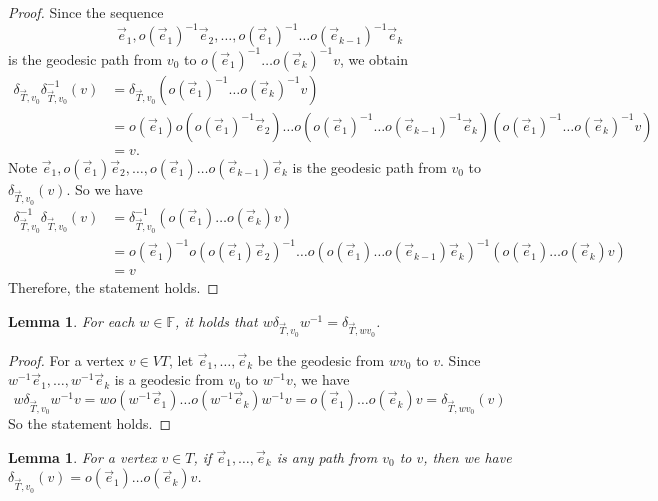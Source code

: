 \documentclass[12pt,a4paper]{amsart}
\numberwithin{equation}{section}
\newcommand{\FF}{\mathbb{F}}
\theoremstyle{plain}
\newtheorem{lemma}[theorem]{Lemma}
\theoremstyle{definition}
\theoremstyle{remark}
\begin{document}
\begin{proof}
    Since the sequence \[\vec{e}_1, o(\vec{e}_1)^{-1}\vec{e}_2, \dots, o(\vec{e}_1)^{-1} \dots o(\vec{e}_{k-1})^{-1}\vec{e}_k\] is the geodesic path from $v_0$ to $o(\vec{e}_1)^{-1} \dots o(\vec{e}_k)^{-1}v$, we obtain
    \begin{align*}
        \delta_{\vec{T}, v_0}\delta_{\vec{T}, v_0}^{-1}(v) &= \delta_{\vec{T}, v_0}(o(\vec{e}_1)^{-1} \dots o(\vec{e}_k)^{-1}v) \\
        & = o(\vec{e}_1) o(o(\vec{e}_1)^{-1}\vec{e}_2) \dots o(o(\vec{e}_1)^{-1} \dots o(\vec{e}_{k-1})^{-1}\vec{e}_k)( o(\vec{e}_1)^{-1} \dots o(\vec{e}_k)^{-1}v ) \\
        & = v.
    \end{align*}
    Note $\vec{e}_1, o(\vec{e}_1)\vec{e}_2, \dots, o(\vec{e}_1) \dots o(\vec{e}_{k-1})\vec{e}_k$ is the geodesic path from $v_0$ to $\delta_{\vec{T}, v_0}(v)$.
    So we have
    \begin{align*}
        \delta_{\vec{T}, v_0}^{-1} \delta_{\vec{T}, v_0}(v) &= \delta_{\vec{T}, v_0}^{-1}(o(\vec{e}_1) \dots o(\vec{e}_k)v)\\
        &= o(\vec{e}_1)^{-1}o(o(\vec{e}_1)\vec{e}_2)^{-1} \dots o(o(\vec{e}_1) \dots o(\vec{e}_{k-1})\vec{e}_k)^{-1}(o(\vec{e}_1) \dots o(\vec{e}_k)v) \\
        &= v
    \end{align*}
    Therefore, the statement holds.
\end{proof}

\begin{lemma}
    For each $w \in \FF$, it holds that $w\delta_{\vec{T}, v_0} w^{-1} = \delta_{\vec{T},wv_0}$.
\end{lemma}

\begin{proof}
    For a vertex $v \in VT$, let $\vec{e}_1, \dots, \vec{e}_k$ be the geodesic from $wv_0$ to $v$.
    Since $w^{-1}\vec{e}_1, \dots, w^{-1}\vec{e}_k$ is a geodesic from $v_0$ to $w^{-1}v$, we have
    \[
        w\delta_{\vec{T}, v_0}w^{-1}v = wo(w^{-1}\vec{e}_1) \dots o(w^{-1}\vec{e}_k)w^{-1}v = o(\vec{e}_1) \dots o(\vec{e}_k)v = \delta_{\vec{T}, wv_0}(v)
    \]
    So the statement holds.
\end{proof}

\begin{lemma}
    For a vertex $v \in T$, if $\vec{e}_1, \dots, \vec{e}_k$ is any path from $v_0$ to $v$, then we have $\delta_{\vec{T}, v_0}(v) = o(\vec{e}_1) \dots o(\vec{e}_k) v$.
\end{lemma}
\end{document}

